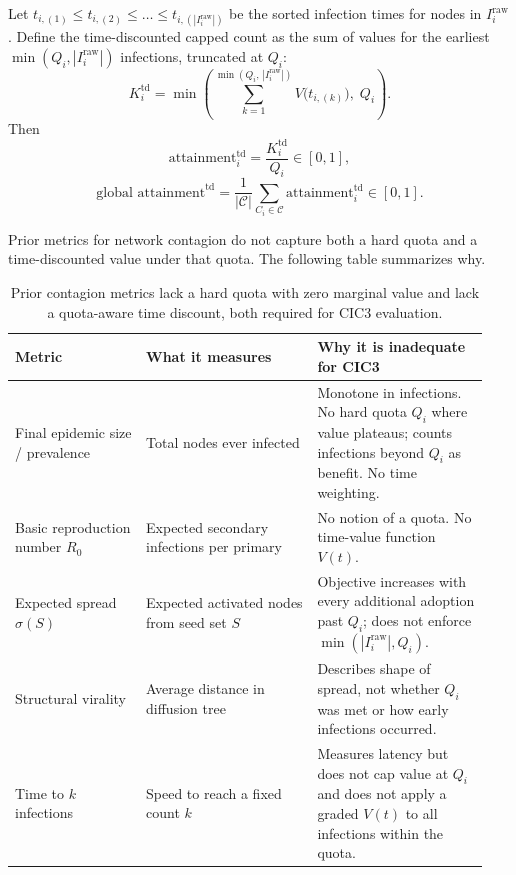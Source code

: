 \documentclass{article}
\begin{document}
Let $t_{i,(1)} \le t_{i,(2)} \le \dots \le t_{i,(|I_i^{\text{raw}}|)}$ be the sorted infection times for nodes in $I_i^{\text{raw}}$. Define the time-discounted capped count as the sum of values for the earliest $\min(Q_i,|I_i^{\text{raw}}|)$ infections, truncated at $Q_i$:
\begin{equation}
K_i^{\text{td}} = \min\!\left( \sum_{k=1}^{\min(Q_i,\,|I_i^{\text{raw}}|)} V\!\big(t_{i,(k)}\big),\; Q_i \right).
\end{equation}
Then
\begin{equation}
\text{attainment}_i^{\text{td}} = \frac{K_i^{\text{td}}}{Q_i} \in [0,1],
\end{equation}
\begin{equation}
\text{global attainment}^{\text{td}} = \frac{1}{|\mathcal{C}|} \sum_{C_i \in \mathcal{C}} \text{attainment}_i^{\text{td}} \in [0,1].
\end{equation}

Prior metrics for network contagion do not capture both a hard quota and a time-discounted value under that quota. The following table summarizes why.

\begin{table}[t]
\centering
\begin{tabular}{p{0.26\linewidth} p{0.34\linewidth} p{0.34\linewidth}}
\toprule
Metric & What it measures & Why it is inadequate for CIC3 \\
\midrule
Final epidemic size / prevalence & Total nodes ever infected & Monotone in infections. No hard quota $Q_i$ where value plateaus; counts infections beyond $Q_i$ as benefit. No time weighting. \\
Basic reproduction number $R_0$ & Expected secondary infections per primary & No notion of a quota. No time-value function $V(t)$. \\
Expected spread $\sigma(S)$ & Expected activated nodes from seed set $S$ & Objective increases with every additional adoption past $Q_i$; does not enforce $\min(|I_i^{\text{raw}}|, Q_i)$. \\
Structural virality & Average distance in diffusion tree & Describes shape of spread, not whether $Q_i$ was met or how early infections occurred. \\
Time to $k$ infections & Speed to reach a fixed count $k$ & Measures latency but does not cap value at $Q_i$ and does not apply a graded $V(t)$ to all infections within the quota. \\
\bottomrule
\end{tabular}
\caption{Prior contagion metrics lack a hard quota with zero marginal value and lack a quota-aware time discount, both required for CIC3 evaluation.}
\label{tab:prior-metrics}
\end{table}
\end{document}

